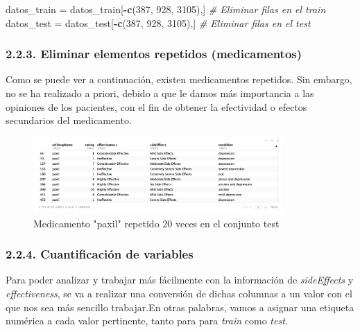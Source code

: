 \documentclass[spanish,]{article}
\newenvironment{Shaded}{\begin{snugshade}}{\end{snugshade}}
\newcommand{\KeywordTok}[1]{\textcolor[rgb]{0.13,0.29,0.53}{\textbf{#1}}}
\newcommand{\DecValTok}[1]{\textcolor[rgb]{0.00,0.00,0.81}{#1}}
\newcommand{\StringTok}[1]{\textcolor[rgb]{0.31,0.60,0.02}{#1}}
\newcommand{\CommentTok}[1]{\textcolor[rgb]{0.56,0.35,0.01}{\textit{#1}}}
\newcommand{\OperatorTok}[1]{\textcolor[rgb]{0.81,0.36,0.00}{\textbf{#1}}}
\newcommand{\NormalTok}[1]{#1}
\begin{document}
\begin{Shaded}
\begin{Highlighting}[]
\NormalTok{datos_train =}\StringTok{ }\NormalTok{datos_train[}\OperatorTok{-}\KeywordTok{c}\NormalTok{(}\DecValTok{387}\NormalTok{, }\DecValTok{928}\NormalTok{, }\DecValTok{3105}\NormalTok{),] }\CommentTok{# Eliminar filas en el train}
\NormalTok{datos_test =}\StringTok{ }\NormalTok{datos_test[}\OperatorTok{-}\KeywordTok{c}\NormalTok{(}\DecValTok{387}\NormalTok{, }\DecValTok{928}\NormalTok{, }\DecValTok{3105}\NormalTok{),] }\CommentTok{# Eliminar filas en el test}
\end{Highlighting}
\end{Shaded}

\subsubsection{2.2.3. Eliminar elementos repetidos
(medicamentos)}\label{eliminar-elementos-repetidos-medicamentos}

Como se puede ver a continuación, existen medicamentos repetidos. Sin
embargo, no se ha realizado a priori, debido a que le damos más
importancia a las opiniones de los pacientes, con el fin de obtener la
efectividad o efectos secundarios del medicamento.

\begin{figure}[h]
    \centering
    \includegraphics[width=0.85\textwidth]{imagenes/medicamentos_duplicados.png}
    \caption{Medicamento "paxil" repetido 20 veces en el conjunto test}
    \label{medicamentos_repetidos}
\end{figure}

\subsubsection{2.2.4. Cuantificación de
variables}\label{cuantificacion-de-variables}

Para poder analizar y trabajar más fácilmente con la información de
\emph{sideEffects} y \emph{effectiveness}, se va a realizar una
conversión de dichas columnas a un valor con el que nos sea más sencillo
trabajar.En otras palabras, vamos a asignar una etiqueta numérica a cada
valor pertinente, tanto para para \emph{train} como \emph{test}.
\end{document}
